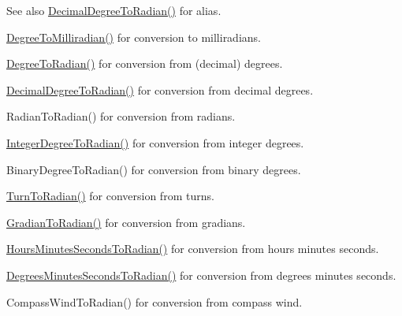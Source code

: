 \begin{DoxySeeAlso}{See also}
\mbox{\hyperlink{group___e_g_x_math-_conversions-_angle_conversions-_decimal_degree_ga906ee2c83cdf4caa59eb613dc2d5d52a}{Decimal\+Degree\+To\+Radian()}} for alias. 

\mbox{\hyperlink{group___e_g_x_math-_conversions-_angle_conversions-_degree_gae4fa6c2d3805430760783650cfbfdb11}{Degree\+To\+Milliradian()}} for conversion to milliradians. 

\mbox{\hyperlink{group___e_g_x_math-_conversions-_angle_conversions-_degree_ga48585541b228c852c9d08a9eac3682f0}{Degree\+To\+Radian()}} for conversion from (decimal) degrees. 

\mbox{\hyperlink{group___e_g_x_math-_conversions-_angle_conversions-_decimal_degree_ga906ee2c83cdf4caa59eb613dc2d5d52a}{Decimal\+Degree\+To\+Radian()}} for conversion from decimal degrees. 

Radian\+To\+Radian() for conversion from radians. 

\mbox{\hyperlink{group___e_g_x_math-_conversions-_angle_conversions-_integer_degree_ga05d3368b00ea27b9895de2ffe5c8df38}{Integer\+Degree\+To\+Radian()}} for conversion from integer degrees. 

Binary\+Degree\+To\+Radian() for conversion from binary degrees. 

\mbox{\hyperlink{group___e_g_x_math-_conversions-_angle_conversions-_turn_ga72e6d3c46ebfc25f7be5050136d8df16}{Turn\+To\+Radian()}} for conversion from turns. 

\mbox{\hyperlink{group___e_g_x_math-_conversions-_angle_conversions-_gradian_ga7ea0a6f47a672715b960181606c8fd7b}{Gradian\+To\+Radian()}} for conversion from gradians. 

\mbox{\hyperlink{group___e_g_x_math-_conversions-_angle_conversions-_hours_minutes_seconds_gaa0b04e9012ec739df1464298971e3be7}{Hours\+Minutes\+Seconds\+To\+Radian()}} for conversion from hours minutes seconds. 

\mbox{\hyperlink{group___e_g_x_math-_conversions-_angle_conversions-_degrees_minutes_seconds_ga6c99d7a2a1646b3d9c8d40cd7f083aa4}{Degrees\+Minutes\+Seconds\+To\+Radian()}} for conversion from degrees minutes seconds. 

Compass\+Wind\+To\+Radian() for conversion from compass wind. 
\end{DoxySeeAlso}
\mbox{\label{group___e_g_x_math-_conversions-_angle_conversions-_degree_gafb4ce930493a7d6202ede3ee1630ef5d}} 
